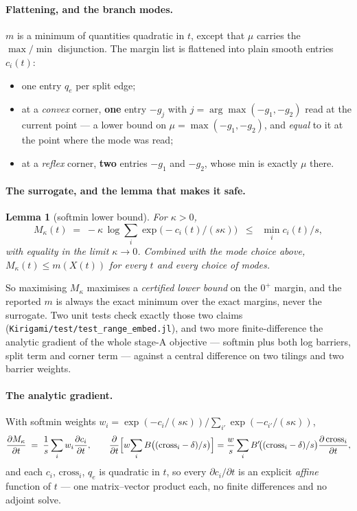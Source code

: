 \documentclass[11pt,a4paper]{article}
\newtheorem{lemma}[theorem]{Lemma}
\theoremstyle{definition}
\newcommand{\file}[1]{\texttt{\small #1}}
\begin{document}
\paragraph{Flattening, and the branch modes.} $m$ is a minimum of quantities quadratic in $t$,
except that $\mu$ carries the $\max/\min$ disjunction. The margin list is flattened into plain
smooth entries $c_i(t)$:
\begin{itemize}\itemsep1pt
\item one entry $q_e$ per split edge;
\item at a \emph{convex} corner, \textbf{one} entry $-g_j$ with $j=\arg\max(-g_1,-g_2)$ read at
the current point --- a lower bound on $\mu=\max(-g_1,-g_2)$, and \emph{equal} to it at the
point where the mode was read;
\item at a \emph{reflex} corner, \textbf{two} entries $-g_1$ and $-g_2$, whose min is exactly
$\mu$ there.
\end{itemize}

\paragraph{The surrogate, and the lemma that makes it safe.}
\begin{lemma}[softmin lower bound]
\label{lem:softmin}
For $\kappa>0$,
\[
M_\kappa(t) \;=\; -\kappa\,\log\sum_i \exp\!\bigl(-c_i(t)/(s\kappa)\bigr)
\;\;\le\;\; \min_i c_i(t)/s ,
\]
with equality in the limit $\kappa\to0$. Combined with the mode choice above,
$M_\kappa(t)\le m(X(t))$ for \emph{every} $t$ and every choice of modes.
\end{lemma}
\noindent So maximising $M_\kappa$ maximises a \emph{certified lower bound} on the $0^+$
margin, and the reported $m$ is always the exact minimum over the exact margins, never the
surrogate. Two unit tests check exactly those two claims
(\file{Kirigami/test/test\_range\_embed.jl}), and two more finite-difference the analytic
gradient of the whole stage-A objective --- softmin plus both log barriers, split term and
corner term --- against a central difference on two tilings and two barrier weights.

\paragraph{The analytic gradient.} With softmin weights
$w_i = \exp(-c_i/(s\kappa))/\sum_{i'}\exp(-c_{i'}/(s\kappa))$,
\[
\frac{\partial M_\kappa}{\partial t} \;=\; \frac{1}{s}\sum_i w_i \frac{\partial c_i}{\partial t},
\qquad
\frac{\partial}{\partial t}\Bigl[w\!\sum_i B\bigl((\mathrm{cross}_i-\delta)/s\bigr)\Bigr]
= \frac{w}{s}\sum_i B'\!\bigl((\mathrm{cross}_i-\delta)/s\bigr)\frac{\partial\,\mathrm{cross}_i}{\partial t},
\]
and each $c_i$, $\mathrm{cross}_i$, $q_e$ is quadratic in $t$, so every
$\partial c_i/\partial t$ is an explicit \emph{affine} function of $t$ --- one matrix--vector
product each, no finite differences and no adjoint solve.
\end{document}
